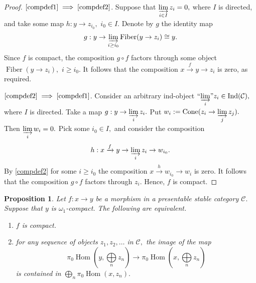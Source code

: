 \documentclass[11pt,leqno]{amsart}
\newcommand{\Implies}[2]{$\text{\ref{#1}}\implies\text{\ref{#2}}$}
\newtheorem{prop}[theo]{Proposition}
\numberwithin{equation}{section}
\def\Hom{\operatorname{Hom}}
\newcommand{\indlim}[1][]{\mathop{\varinjlim}\limits_{#1}}
\newcommand{\inddlim}[1][]{{``{\indlim[#1]}"}}
\newcommand{\biggplus}[1][]{\mathop{\bigoplus}\limits_{#1}}
\newcommand{\xto}{\xrightarrow}
\newcommand{\Cone}{\operatorname{Cone}}
\newcommand{\Fiber}{\operatorname{Fiber}}
\newcommand{\cC}{{\mathcal C}}
\newcommand{\Ind}{\operatorname{Ind}}
\begin{document}
\begin{proof}\Implies{compdef1}{compdef2}. Suppose that $\indlim[i\in I]z_i=0,$ where $I$ is directed, and take some map $h:y\to z_{i_0},$ $i_0\in I.$ Denote by $g$ the identity map
$$g:y\to\indlim[i\geq i_0]\Fiber(y\to z_i)\cong y.$$
Since $f$ is compact, the composition $g\circ f$ factors through some object $\Fiber(y\to z_i),$ $i\geq i_0.$ It follows that the composition $x\xto{f}y\to z_i$ is zero, as required.

\Implies{compdef2}{compdef1}. Consider an arbitrary ind-object $\inddlim[i]z_i\in\Ind(\cC),$ where $I$ is directed. Take a map $g:y\to\indlim[i]z_i.$ Put $w_i:=\Cone(z_i\to\indlim[j]z_j).$ Then $\indlim[i]w_i=0.$ Pick some $i_0\in I,$ and consider the composition $$h:x\xto{f} y\to\indlim[i]z_i\to w_{i_0}.$$ By \ref{compdef2} for some $i\geq i_0$ the composition $x\xto{h}w_{i_0}\to w_i$ is zero. It follows that the composition $g\circ f$ factors through $z_i.$ Hence, $f$ is compact. \end{proof}

\begin{prop}\label{prop:compact_maps_via_direct_sums} Let $f:x\to y$ be a morphism in a presentable stable category $\cC.$ Suppose that $y$ is $\omega_1$-compact. The following are equivalent.

\begin{enumerate}[label=(\roman*),ref=(\roman*)]
\item $f$ is compact. \label{comp_countable1}

\item for any sequence of objects $z_1,z_2,\dots$ in $\cC,$ the image of the map
$$\pi_0\Hom(y,\biggplus[n]z_n)\to \pi_0\Hom(x,\biggplus[n]z_n)$$
is contained in $\biggplus[n]\pi_0\Hom(x,z_n).$ \label{comp_countable2}
\end{enumerate}
\end{prop}
\end{document}
